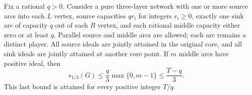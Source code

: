 \begin{theorem}\label{flow:quota}
Fix a rational $q>0$. Consider a pure three-layer network with one or more source
arcs into each $L$ vertex, source capacities $q r_i$ for integers
$r_i\ge0$, exactly one sink arc of capacity $q$ out of each $R$ vertex,
and each rational middle capacity either zero or at least $q$. Parallel source
and middle arcs are allowed; each arc remains a distinct player.
All source ideals are jointly attained in the original core, and all
sink ideals are jointly attained at another core point. If $m$ middle
arcs have positive ideal, then
\begin{equation}\label{flow:quota-bound}
 s_{1/3}(G)\le\frac q3\max\{0,m-1\}\le\frac{T-q}{3}.
\end{equation}
This last bound is attained for every positive integer $T/q$.
\end{theorem}
